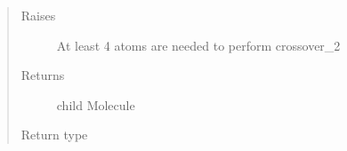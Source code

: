 \documentclass[letterpaper,10pt,english]{sphinxmanual}
\begin{document}
\begin{fulllineitems}
\begin{quote}
\begin{description}
\begin{itemize}
\end{itemize}

\item[{Raises}] \leavevmode
\sphinxAtStartPar
{} \textendash{} At least 4 atoms are needed to perform crossover\_2

\item[{Returns}] \leavevmode
\sphinxAtStartPar
child Molecule

\item[{Return type}] \leavevmode
\sphinxAtStartPar
{\hyperref[\detokenize{MolOpt.molecular:MolOpt.molecular.molecular.Molecule}]{}}

\end{description}\end{quote}

\end{fulllineitems}

\end{document}
